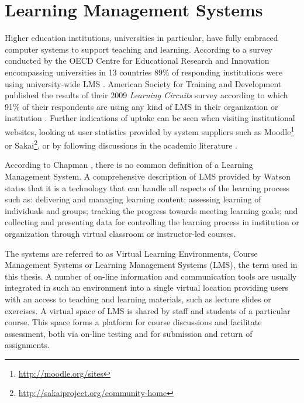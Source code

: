 \section{Learning Management Systems}
Higher education institutions, universities in particular, have fully embraced
computer systems to support teaching and learning. According to a survey
conducted by the OECD Centre for Educational Research and Innovation
encompassing universities in 13 countries 89\% of responding institutions were
using university-wide LMS \citep{OECD2005}. American Society for Training and
Development published the results of their 2009 \textit{Learning Circuits}
survey according to which 91\% of their respondents are using any kind of LMS in
their organization or institution \citep{Ellis2009}. Further indications of
uptake can be seen when visiting institutional websites, looking at user
statistics provided by system suppliers such as
Moodle\footnote{\url{http://moodle.org/sites}} or
Sakai\footnote{\url{http://sakaiproject.org/community-home}}, or by following
discussions in the academic literature \citep{Browne2006,Collis2004}.

According to Chapman \citeyearpar{Chapman2009}, there is no common definition of
a Learning Management System. A comprehensive description of LMS provided by
Watson \citeyearpar{Watson2007} states that it is a technology that can handle
all aspects of the learning process such as: delivering and managing learning
content; assessing learning of individuals and groups; tracking the progress
towards meeting learning goals; and collecting and presenting data for
controlling the learning process in institution or organization through virtual
classroom or instructor-led courses.

The systems are referred to as Virtual Learning Environments, Course Management
Systems or Learning Management Systems (LMS), the term used in this thesis. A
number of on-line information and communication tools are usually integrated in
such an environment into a single virtual location \citep{Morgan-Klein2007}
providing users with an access to teaching and learning materials, such as
lecture slides or exercises. A virtual space of LMS is shared by staff and
students of a particular course. This space forms a platform for course
discussions and facilitate assessment, both via on-line testing and for
submission and return of assignments.

